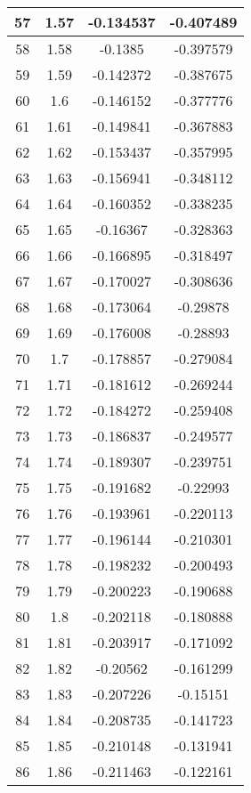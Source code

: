 \begin{table}
\begin{center}
\begin{tabular}{c|c|c|c}
			57 & 1.57 & -0.134537 & -0.407489 \\
			\hline
			58 & 1.58 & -0.1385 & -0.397579 \\
			\hline
			59 & 1.59 & -0.142372 & -0.387675 \\
			\hline
			60 & 1.6 & -0.146152 & -0.377776 \\
			\hline
			61 & 1.61 & -0.149841 & -0.367883 \\
			\hline
			62 & 1.62 & -0.153437 & -0.357995 \\
			\hline
			63 & 1.63 & -0.156941 & -0.348112 \\
			\hline
			64 & 1.64 & -0.160352 & -0.338235 \\
			\hline
			65 & 1.65 & -0.16367 & -0.328363 \\
			\hline
			66 & 1.66 & -0.166895 & -0.318497 \\
			\hline
			67 & 1.67 & -0.170027 & -0.308636 \\
			\hline
			68 & 1.68 & -0.173064 & -0.29878 \\
			\hline
			69 & 1.69 & -0.176008 & -0.28893 \\
			\hline
			70 & 1.7 & -0.178857 & -0.279084 \\
			\hline
			71 & 1.71 & -0.181612 & -0.269244 \\
			\hline
			72 & 1.72 & -0.184272 & -0.259408 \\
			\hline
			73 & 1.73 & -0.186837 & -0.249577 \\
			\hline
			74 & 1.74 & -0.189307 & -0.239751 \\
			\hline
			75 & 1.75 & -0.191682 & -0.22993 \\
			\hline
			76 & 1.76 & -0.193961 & -0.220113 \\
			\hline
			77 & 1.77 & -0.196144 & -0.210301 \\
			\hline
			78 & 1.78 & -0.198232 & -0.200493 \\
			\hline
			79 & 1.79 & -0.200223 & -0.190688 \\
			\hline
			80 & 1.8 & -0.202118 & -0.180888 \\
			\hline
			81 & 1.81 & -0.203917 & -0.171092 \\
			\hline
			82 & 1.82 & -0.20562 & -0.161299 \\
			\hline
			83 & 1.83 & -0.207226 & -0.15151 \\
			\hline
			84 & 1.84 & -0.208735 & -0.141723 \\
			\hline
			85 & 1.85 & -0.210148 & -0.131941 \\
			\hline
			86 & 1.86 & -0.211463 & -0.122161 \\

\end{tabular}
\end{center}
\end{table}
